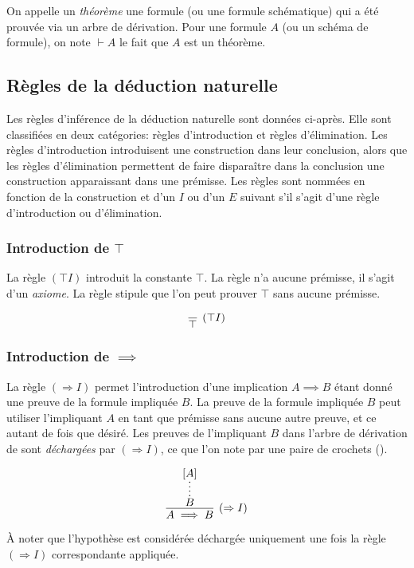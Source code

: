 On appelle un \og \textit{théorème} \fg{} une formule (ou une formule schématique) qui a été prouvée via un arbre de dérivation.
Pour une formule $A$ (ou un schéma de formule), on note $\vdash A$ le fait que $A$ est un théorème.

\subsection{Règles de la déduction naturelle}

Les règles d'inférence de la déduction naturelle sont données ci-après.
Elle sont classifiées en deux catégories: règles d'introduction et règles d'élimination.
Les règles d'introduction introduisent une construction dans leur conclusion,
alors que les règles d'élimination permettent de faire disparaître dans la conclusion une construction apparaissant dans une prémisse.
Les règles sont nommées en fonction de la construction et d'un $I$ ou d'un $E$ suivant s'il s'agit d'une règle d'introduction ou d'élimination.

\subsubsection{Introduction de $\top$}

La règle $({\top}I)$ introduit la constante $\top$.
La règle n'a aucune prémisse, il s'agit d'un \textit{axiome}.
La règle stipule que l'on peut prouver $\top$ sans aucune prémisse.

\[
\infer[({\top}I)]{\top}{}
\]

\subsubsection{Introduction de $\implies$}

La règle $({\Rightarrow{}}I)$ permet l'introduction d'une implication $A \implies B$ étant donné une preuve de la formule impliquée $B$.
La preuve de la formule impliquée $B$ peut utiliser l'impliquant $A$ en tant que prémisse sans aucune autre preuve, et ce autant de fois que désiré.
Les preuves de l'impliquant $B$ dans l'arbre de dérivation de sont \og \textit{déchargées} \fg{} par $({\Rightarrow{}}I)$, ce que l'on note par une paire de crochets (\og [ \fg{} et \og ] \fg{}).

\[
\infer[({\Rightarrow{}}I)]{A \implies B}{\infer*{B}{[A]}}
\]

À noter que l'hypothèse est considérée déchargée uniquement une fois la règle $({\Rightarrow{}}I)$ correspondante appliquée.

